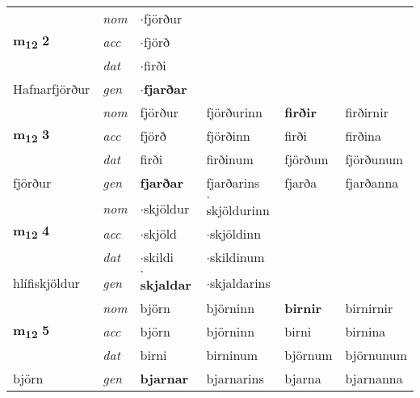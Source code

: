 \begin{longtable}[l]{llllll}
\multirow{3}{*}{{{\textbf{m{\textsubscript{12}}} \Large{\textbf{2}}}}}  & {\footnotesize{{\textit{nom}}}} & $\cdot$fjörður &     & \textbf{} &   \\*
 &  {\footnotesize{{\textit{acc}}}} & $\cdot$fjörð  &    &   &  \\*
 &  {\footnotesize{{\textit{dat}}}} & $\cdot$firði &    &  &  \\*
 {\footnotesize{Hafnarfjörður}} &   {\footnotesize{{\textit{gen}}}} & \textbf{$\cdot$fjarðar}  &   &  &  \\
\cmidrule{1-6}


\multirow{3}{*}{{{\textbf{m{\textsubscript{12}}} \Large{\textbf{3}}}}}  & {\footnotesize{{\textit{nom}}}} & fjörður & fjörðurinn    & \textbf{firðir} & firðirnir  \\*
 &  {\footnotesize{{\textit{acc}}}} & fjörð  & fjörðinn   & firði  & firðina \\*
 &  {\footnotesize{{\textit{dat}}}} & firði & firðinum   & fjörðum & fjörðunum \\*
 {\footnotesize{fjörður}} &   {\footnotesize{{\textit{gen}}}} & \textbf{fjarðar}  & fjarðarins  & fjarða & fjarðanna \\
\cmidrule{1-6}


\multirow{3}{*}{{{\textbf{m{\textsubscript{12}}} \Large{\textbf{4}}}}}  & {\footnotesize{{\textit{nom}}}} & $\cdot$skjöldur & $\cdot$skjöldurinn    & \textbf{} &   \\*
 &  {\footnotesize{{\textit{acc}}}} & $\cdot$skjöld  & $\cdot$skjöldinn   &   &  \\*
 &  {\footnotesize{{\textit{dat}}}} & $\cdot$skildi & $\cdot$skildinum   &  &  \\*
 {\footnotesize{hlífiskjöldur}} &   {\footnotesize{{\textit{gen}}}} & \textbf{$\cdot$skjaldar}  & $\cdot$skjaldarins  &  &  \\
\cmidrule{1-6}


\multirow{3}{*}{{{\textbf{m{\textsubscript{12}}} \Large{\textbf{5}}}}}  & {\footnotesize{{\textit{nom}}}} & björn & björninn    & \textbf{birnir} & birnirnir  \\*
 &  {\footnotesize{{\textit{acc}}}} & björn  & björninn   & birni  & birnina \\*
 &  {\footnotesize{{\textit{dat}}}} & birni & birninum   & björnum & björnunum \\*
 {\footnotesize{björn}} &   {\footnotesize{{\textit{gen}}}} & \textbf{bjarnar}  & bjarnarins  & bjarna & bjarnanna \\
\cmidrule{1-6}



\end{longtable}
